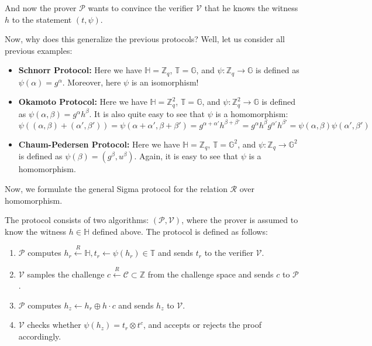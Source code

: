 \documentclass[../lecture-notes.tex]{subfiles}
\begin{document}
And now the prover $\mathcal{P}$ wants to convince the verifier $\mathcal{V}$ that he knows the witness $h$ to the statement $(t,\psi)$. 
\begin{proposition}
    Now, why does this generalize the previous protocols? Well, let us consider all previous examples:
    \begin{itemize}
        \item \textbf{Schnorr Protocol:} Here we have $\mathbb{H} = \mathbb{Z}_q$, $\mathbb{T} = \mathbb{G}$, and $\psi: \mathbb{Z}_q \to \mathbb{G}$ is defined as $\psi(\alpha) = g^{\alpha}$. Moreover, here $\psi$ is an isomorphism!
        \item \textbf{Okamoto Protocol:} Here we have $\mathbb{H} = \mathbb{Z}_q^2$, $\mathbb{T} = \mathbb{G}$, and $\psi: \mathbb{Z}_q^2 \to \mathbb{G}$ is defined as $\psi(\alpha,\beta) = g^{\alpha}h^{\beta}$. It is also quite easy to see that $\psi$ is a homomorphism:
        \begin{equation*}
            \psi((\alpha,\beta) + (\alpha',\beta')) = \psi(\alpha+\alpha',\beta+\beta') = g^{\alpha+\alpha'}h^{\beta+\beta'} = g^{\alpha}h^{\beta}g^{\alpha'}h^{\beta'} = \psi(\alpha,\beta)\psi(\alpha',\beta')
        \end{equation*}
        \item \textbf{Chaum-Pedersen Protocol:} Here we have $\mathbb{H} = \mathbb{Z}_q$, $\mathbb{T} = \mathbb{G}^2$, and $\psi: \mathbb{Z}_q \to \mathbb{G}^2$ is defined as $\psi(\beta) = (g^{\beta},u^{\beta})$. Again, it is easy to see that $\psi$ is a homomorphism.
    \end{itemize}
\end{proposition}

Now, we formulate the general Sigma protocol for the relation $\mathcal{R}$ over homomorphism.

\begin{definition}
    The protocol consists of two algorithms: $(\mathcal{P}, \mathcal{V})$, where the prover is assumed to know the witness $h \in \mathbb{H}$ defined above. The protocol is defined as follows:
    \begin{enumerate}
        \item $\mathcal{P}$ computes $h_r \xleftarrow{R} \mathbb{H}, t_r \gets \psi(h_r) \in \mathbb{T}$ and sends $t_r$ to the verifier $\mathcal{V}$.
        \item $\mathcal{V}$ samples the challenge $c \xleftarrow{R} \mathcal{C} \subset \mathbb{Z}$ from the challenge space and sends $c$ to $\mathcal{P}$.
        \item $\mathcal{P}$ computes $h_z \gets h_r \oplus h\cdot c$ and sends $h_z$ to $\mathcal{V}$.
        \item $\mathcal{V}$ checks whether $\psi(h_z) = t_r \otimes t^c$, and accepts or rejects the proof accordingly.
    \end{enumerate}
\end{definition}
\end{document}
